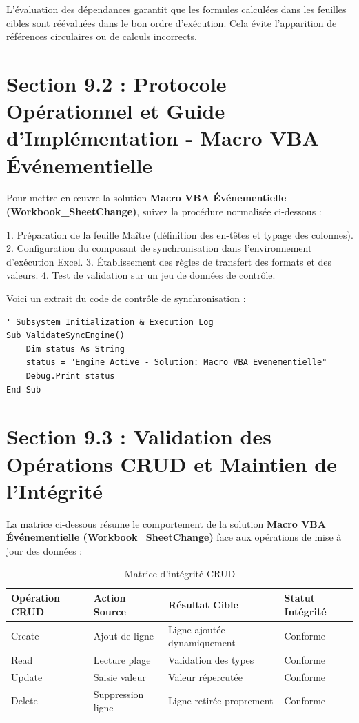 \documentclass[12pt,a4paper]{report}
\begin{document}
L'évaluation des dépendances garantit que les formules calculées dans les feuilles cibles sont réévaluées dans le bon ordre d'exécution. Cela évite l'apparition de références circulaires ou de calculs incorrects.


\section{Section 9.2 : Protocole Opérationnel et Guide d'Implémentation - Macro VBA Événementielle}
Pour mettre en œuvre la solution \textbf{Macro VBA Événementielle (Workbook\_SheetChange)}, suivez la procédure normalisée ci-dessous :

1. Préparation de la feuille Maître (définition des en-têtes et typage des colonnes).
2. Configuration du composant de synchronisation dans l'environnement d'exécution Excel.
3. Établissement des règles de transfert des formats et des valeurs.
4. Test de validation sur un jeu de données de contrôle.

Voici un extrait du code de contrôle de synchronisation :
\begin{lstlisting}[caption=Code de controle operationnel]
' Subsystem Initialization & Execution Log
Sub ValidateSyncEngine()
    Dim status As String
    status = "Engine Active - Solution: Macro VBA Evenementielle"
    Debug.Print status
End Sub
\end{lstlisting}


\section{Section 9.3 : Validation des Opérations CRUD et Maintien de l'Intégrité}
La matrice ci-dessous résume le comportement de la solution \textbf{Macro VBA Événementielle (Workbook\_SheetChange)} face aux opérations de mise à jour des données :

\begin{table}[h]
\centering
\begin{tabular}{@{}llll@{}}
\toprule
\textbf{Opération CRUD} & \textbf{Action Source} & \textbf{Résultat Cible} & \textbf{Statut Intégrité} \\ \midrule
Create & Ajout de ligne & Ligne ajoutée dynamiquement & Conforme \\
Read & Lecture plage & Validation des types & Conforme \\
Update & Saisie valeur & Valeur répercutée & Conforme \\
Delete & Suppression ligne & Ligne retirée proprement & Conforme \\ \bottomrule
\end{tabular}
\caption{Matrice d'intégrité CRUD}
\end{table}
\end{document}
